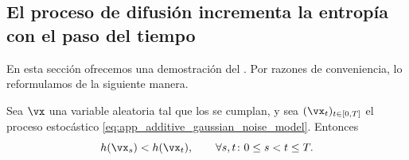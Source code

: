 \documentclass[../../book-main_es.tex]{subfiles}
\begin{document}
\subsection{El proceso de difusión incrementa la entropía con el
paso del tiempo}\label{sub:diffusion_entropy_increases}

En esta sección ofrecemos una demostración del
. Por razones de conveniencia, lo reformulamos
de la siguiente manera.

\begin{theorem}\label{thm:diffusion_entropy_increases}
    Sea \(\vx\) una variable aleatoria tal que los
    se cumplan, y sea \((\vx_{t})_{t \in [0, T]}\) el proceso estocástico
    \eqref{eq:app_additive_gaussian_noise_model}. Entonces
    \begin{equation}\label{eq:diffusion_entropy_increases}
        h(\vx_{s}) < h(\vx_{t}), \qquad \forall s, t \colon 0 \leq s < t \leq T.
    \end{equation}
\end{theorem}
\end{document}
